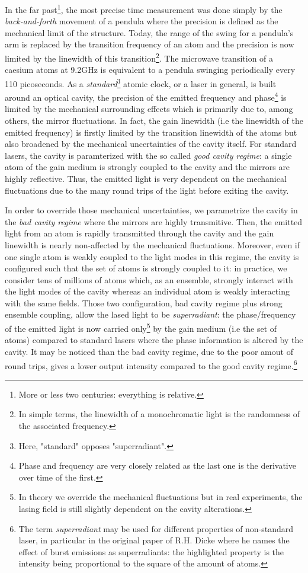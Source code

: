 \documentclass[12pt]{report}
\begin{document}
In the far past\footnote{More or less two centuries: everything is relative.}, the most precise time measurement was done simply by the \textit{back-and-forth} movement of a pendula where the precision is defined as the mechanical limit of the structure. Today, the range of the swing for a pendula's arm is replaced by the transition frequency of an atom and the precision is now limited by the linewidth of this transition\footnote{In simple terms, the linewidth of a monochromatic light is the randomness of the associated frequency.}. The microwave transition of a caesium atoms at 9.2GHz is equivalent to a pendula swinging periodically every 110 picoseconds. As a \textit{standard}\footnote{Here, "standard" opposes "superradiant".} atomic clock, or a laser in general, is built around an optical cavity, the precision of the emitted frequency and phase\footnote{Phase and frequency are very closely related as the last one is the derivative over time of the first.} is limited by the mechanical surrounding effects which is primarily due to, among others, the mirror fluctuations. In fact, the gain linewidth (i.e the linewidth of the emitted frequency) is firstly limited by the transition linewidth of the atoms but also broadened by the mechanical uncertainties of the cavity itself. For standard lasers, the cavity is paramterized with the so called \textit{good cavity regime}: a single atom of the gain medium is strongly coupled to the cavity and the mirrors are highly reflective. Thus, the emitted light is very dependent on the mechanical fluctuations due to the many round trips of the light before exiting the cavity. 

In order to override those mechanical uncertainties, we parametrize the cavity in the \textit{bad cavity regime} where the mirrors are highly transmitive. Then, the emitted light from an atom is rapidly transmitted through the cavity and the gain linewidth is nearly non-affected by the mechanical fluctuations. Moreover, even if one single atom is weakly coupled to the light modes in this regime, the cavity is configured such that the set of atoms is strongly coupled to it: in practice, we consider tens of millions of atoms which, as an ensemble, strongly interact with the light modes of the cavity whereas an individual atom is weakly interacting with the same fields. Those two configuration, bad cavity regime plus strong ensemble coupling, allow the lased light to be \textit{superradiant}: the phase/frequency of the emitted light is now carried only\footnote{In theory we override the mechanical fluctuations but in real experiments, the lasing field is still slightly dependent on the cavity alterations.} by the gain medium (i.e the set of atoms) compared to standard lasers where the phase information is altered by the cavity. It may be noticed than the bad cavity regime, due to the poor amout of round trips, gives a lower output intensity compared to the good cavity regime.\footnote{The term \textit{superradiant} may be used for different properties of non-standard laser, in particular in the original paper of R.H. Dicke where he names the effect of burst emissions as superradiants: the highlighted property is the intensity being proportional to the square of the amount of atoms.}
\end{document}
